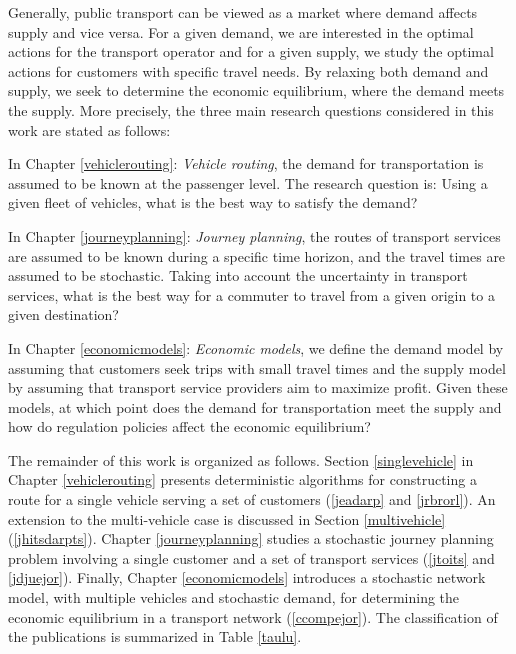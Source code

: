 \documentclass[dissertation,draft*]{aaltoseries}
\begin{document}
Generally, public transport can be viewed as a market where demand affects supply and vice versa.
For a given demand, we are interested in the optimal actions for the transport operator and for a given supply, 
we study the optimal actions for customers with specific travel needs. By relaxing both demand and supply, 
we seek to determine the economic equilibrium, where the demand meets the supply.
More precisely, the three main research questions considered in this work are stated as follows: 

In Chapter \ref{vehiclerouting}: \emph{Vehicle routing}, the demand for transportation is assumed to be known at the passenger level. 
The research question is: Using a given fleet of vehicles, what is the best way to satisfy the demand? 

In Chapter \ref{journeyplanning}: \emph{Journey planning}, the routes of transport services are assumed to be known during a specific time horizon,
and the travel times are assumed to be stochastic.
Taking into account the uncertainty in transport services, what is the best way for a commuter to travel from a given origin to a given destination?

In Chapter \ref{economicmodels}: \emph{Economic models}, we define the demand model by assuming that customers seek trips with
small travel times and the supply model by assuming that transport service providers aim to maximize profit. Given these models,
at which point does the demand for transportation meet the supply and how do regulation policies affect the economic equilibrium?




The remainder of this work is organized as follows.
Section \ref{singlevehicle} in Chapter \ref{vehiclerouting} presents deterministic algorithms for constructing a route for a 
single vehicle serving a set of customers (\ref{jeadarp} and \ref{jrbrorl}). 
An extension to the multi-vehicle case is discussed in Section \ref{multivehicle} (\ref{jhitsdarpts}). 
Chapter \ref{journeyplanning} studies a stochastic
journey planning problem involving a single customer and a set of transport services (\ref{jtoits} and \ref{jdjuejor}). 
Finally, Chapter \ref{economicmodels} introduces a 
stochastic network model, with multiple vehicles and stochastic demand, for determining the economic equilibrium in a transport network (\ref{ccompejor}). 
The classification of the publications is summarized in Table \ref{taulu}. 
\end{document}
